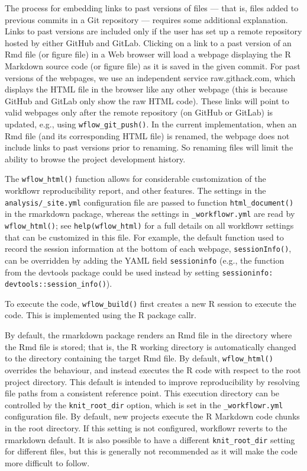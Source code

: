 \documentclass[9pt,a4paper]{extarticle}
\begin{document}
The process for embedding links to past versions of files --- that is,
files added to previous commits in a Git repository --- requires some
additional explanation. Links to past versions are included only if the
user has set up a remote repository hosted by either GitHub and GitLab.
Clicking on a link to a past version of an Rmd file (or figure file) in
a Web browser will load a webpage displaying the R Markdown source code
(or figure file) as it is saved in the given commit. For past versions
of the webpages, we use an independent service raw.githack.com, which
displays the HTML file in the browser like any other webpage (this is
because GitHub and GitLab only show the raw HTML code). These links will
point to valid webpages only after the remote repository (on GitHub or
GitLab) is updated, e.g., using \texttt{wflow\_git\_push()}. In the current
implementation, when an Rmd file (and its corresponding HTML file) is
renamed, the webpage does not include links to past versions prior to
renaming. So renaming files will limit the ability to browse the project
development history.

The \texttt{wflow\_html()} function allows for considerable customization of the
workflowr reproducibility report, and other features. The settings in
the \verb|analysis/_site.yml| configuration file are passed to function
\texttt{html\_document()} in the rmarkdown package, whereas the settings in
\verb|_workflowr.yml| are read by \texttt{wflow\_html()}; see
\texttt{help(wflow\_html)} for a full details on all workflowr settings
that can be customized in this file. For example, the default function
used to record the session information at the bottom of each webpage,
\texttt{sessionInfo()}, can be overridden by adding the YAML field
\verb|sessioninfo| (e.g., the function from the devtools package could
be used instead by setting \texttt{sessioninfo:
devtools::session\_info()}).

To execute the code, \texttt{wflow\_build()} first creates a new R session to
execute the code. This is implemented using the R package callr.

By default, the rmarkdown package renders an Rmd file in the directory
where the Rmd file is stored; that is, the R working directory is
automatically changed to the directory containing the target Rmd file.
By default, \texttt{wflow\_html()} overrides the behaviour, and instead executes
the R code with respect to the root project directory. This default is
intended to improve reproducibility by resolving file paths from a
consistent reference point. This execution directory can be controlled
by the \verb|knit_root_dir| option, which is set in the 
\texttt{\_workflowr.yml} configuration file. By default, new projects execute the
R Markdown code chunks in the root directory. If this setting is not
configured, workflowr reverts to the rmarkdown default. It is also
possible to have a different \texttt{knit\_root\_dir} setting for
different files, but this is generally not recommended as it will make
the code more difficult to follow.
\end{document}

